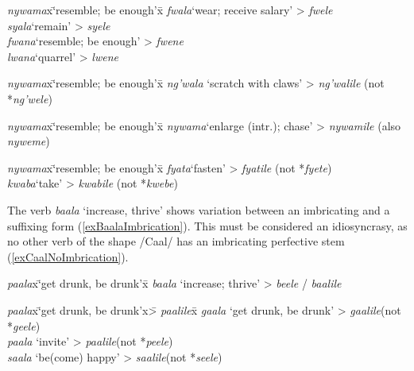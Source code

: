 \begin{exe}
\ex
\begin{tabbing}
\textit{nywama}x\=\lq resemble; be enough'x\=\kill  %
\textit{fwala}\>`wear; receive salary'\> > \textit{fwele}
\\\textit{syala}\>`remain'\> > \textit{syele}\label{exImbricationalaman}
\\\textit{fwana}\>\lq resemble; be enough'\> > \textit{fwene}
\\\textit{lwana}\>`quarrel'\> > \textit{lwene}
\end{tabbing}
\ex\label{exCGAXloansNoImbrication}
\begin{tabbing}
\textit{nywama}x\=\lq resemble; be enough'x\=\kill  %
\textit{ng'wala}\> \lq scratch with claws'\> > \textit{ng'walile} (not *\textit{ng'wele})
\end{tabbing}
\ex\label{exCGAXnywama}
\begin{tabbing}
\textit{nywama}x\=\lq resemble; be enough'x\=\kill  %
\textit{nywama}\>`enlarge (intr.); chase'\> > \textit{nywamile} (also \textit{nyweme})
\end{tabbing}
\ex\label{exCGACnoImbrication}
\begin{tabbing}
\textit{nywama}x\= \lq resemble; be enough'x\=\kill  %
\textit{fyata}\>`fasten'\> > \textit{fyatile} (not *\textit{fyete})
\\\textit{kwaba}\>`take'\> > \textit{kwabile} (not *\textit{kwebe})
\end{tabbing}
\end{exe}

The verb \textit{baala} \lq increase, thrive' shows variation between an imbricating and a suffixing form (\ref{exBaalaImbrication}). This must be considered an idiosyncrasy, as no other verb of the shape /Caal/ has an imbricating perfective stem (\ref{exCaalNoImbrication}).

\begin{exe}
\ex\label{exBaalaImbrication}
\begin{tabbing}
\textit{paala}x\= \lq get drunk, be drunk'x\=\kill  %
\textit{baala}\> \lq increase; thrive' \>> \textit{beele} / \textit{baalile}
\end{tabbing}
\ex\label{exCaalNoImbrication}
\begin{tabbing}
\textit{paala}x\= \lq get drunk, be drunk'x\= > \textit{paalile}x\=\kill  %
\textit{gaala}\> \lq get drunk, be drunk' \> > \textit{gaalile}\>(not *\textit{geele})\\
\textit{paala}\> \lq invite' \> > \textit{paalile}\>(not *\textit{peele})\\
\textit{saala}\> \lq be(come) happy' \> > \textit{saalile}\>(not *\textit{seele})
\end{tabbing}
\end{exe}

